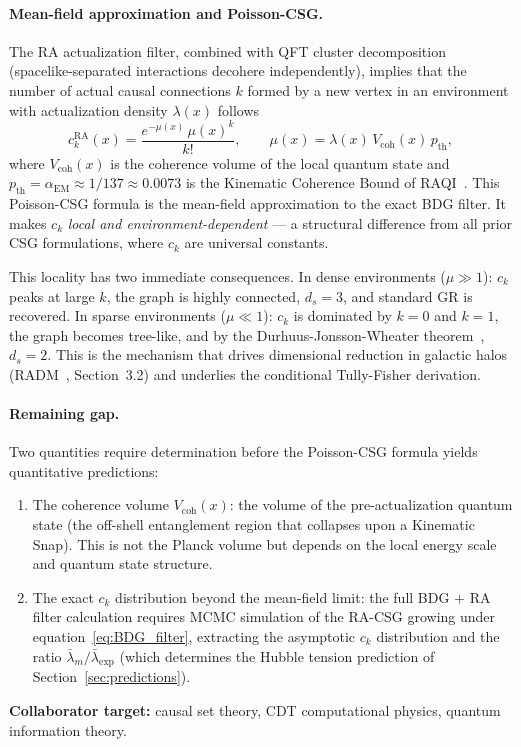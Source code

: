 \documentclass[11pt,a4paper]{article}
\theoremstyle{plain}
\theoremstyle{definition}
\theoremstyle{remark}
\begin{document}
\paragraph{Mean-field approximation and Poisson-CSG.}
The RA actualization filter, combined with QFT cluster decomposition
(spacelike-separated interactions decohere independently), implies that the
number of actual causal connections $k$ formed by a new vertex in an environment
with actualization density $\lambda(x)$ follows
\begin{equation}
  c_k^{\mathrm{RA}}(x) = \frac{e^{-\mu(x)}\,\mu(x)^k}{k!},
  \qquad
  \mu(x) = \lambda(x)\,V_{\mathrm{coh}}(x)\,p_{\mathrm{th}},
  \label{eq:poisson_ck}
\end{equation}
where $V_{\mathrm{coh}}(x)$ is the coherence volume of the local quantum state
and $p_{\mathrm{th}} = \alpha_{\mathrm{EM}} \approx 1/137 \approx 0.0073$ is the Kinematic Coherence Bound of
RAQI~\citep{Sandeman2026RAQI}. This Poisson-CSG formula is the mean-field
approximation to the exact BDG filter. It makes $c_k$ \emph{local and
environment-dependent} --- a structural difference from all prior CSG
formulations, where $c_k$ are universal constants.

This locality has two immediate consequences. In dense environments
($\mu \gg 1$): $c_k$ peaks at large $k$, the graph is highly connected, $d_s
= 3$, and standard GR is recovered. In sparse environments ($\mu \ll 1$): $c_k$
is dominated by $k = 0$ and $k = 1$, the graph becomes tree-like, and by the
Durhuus-Jonsson-Wheater theorem~\citep{Durhuus2010}, $d_s = 2$. This is the
mechanism that drives dimensional reduction in galactic halos
(RADM~\citep{Sandeman2026RADM}, Section~3.2) and underlies the conditional
Tully-Fisher derivation.

\paragraph{Remaining gap.}
Two quantities require determination before the Poisson-CSG formula yields
quantitative predictions:
\begin{enumerate}
\item The coherence volume $V_{\mathrm{coh}}(x)$: the volume of the
  pre-actualization quantum state (the off-shell entanglement region that
  collapses upon a Kinematic Snap). This is not the Planck volume but depends
  on the local energy scale and quantum state structure.
\item The exact $c_k$ distribution beyond the mean-field limit: the full BDG
  + RA filter calculation requires MCMC simulation of the RA-CSG growing under
  equation~\eqref{eq:BDG_filter}, extracting the asymptotic $c_k$ distribution
  and the ratio $\bar\lambda_m/\bar\lambda_{\mathrm{exp}}$ (which determines
  the Hubble tension prediction of Section~\ref{sec:predictions}).
\end{enumerate}
\textbf{Collaborator target:} causal set theory, CDT computational physics,
quantum information theory.
\end{document}
